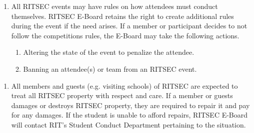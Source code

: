 \begin{enumerate}
  \item All RITSEC events may have rules on how attendees must conduct
    themselves. RITSEC E-Board retains the right to create additional rules
    during the event if the need arises. If a member or participant decides to
    not follow the competitions rules, the E-Board may take the following
    actions. 
  \begin{enumerate}
    \item Altering the state of the event to penalize the attendee.
    \item Banning an attendee(s) or team from an RITSEC event.
  \end{enumerate}
\end{enumerate}


\begin{enumerate}
  \item All members and guests (e.g. visiting schools) of RITSEC are expected
    to treat all RITSEC property with respect and care. If a member or guests
    damages or destroys RITSEC property, they are required to repair it and pay
    for any damages. If the student is unable to afford repairs, RITSEC E-Board
    will contact RIT’s Student Conduct Department pertaining to the situation.
\end{enumerate}